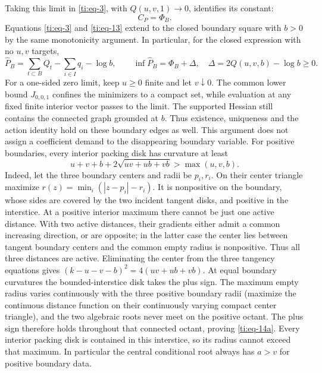 \documentclass[11pt]{article}
\numberwithin{equation}{section}
\theoremstyle{definition}\newtheorem{definition}[theorem]{Definition}
\theoremstyle{remark}\newtheorem{remark}[theorem]{Remark}
\begin{document}
Taking this limit in \eqref{ti:eq-3}, with \(Q(u,v,1)\to0\), identifies its constant:
\begin{equation}\label{ti:eq-13}
C_P=\Phi_B.
\end{equation}
Equations \eqref{ti:eq-3} and \eqref{ti:eq-13} extend to the closed boundary square with \(b>0\) by the same monotonicity argument. In particular, for the closed expression with no \(u,v\) targets,
\begin{equation}\label{ti:eq-14}
\widehat P_B=\sum_{t\subset B}Q_t-\sum_{i\in I}q_i-\log b,
\qquad
\inf\widehat P_B=\Phi_B+\Delta,\quad
\Delta=2Q(u,v,b)-\log b\ge0.
\end{equation}
For a one-sided zero limit, keep \(u\ge0\) finite and let \(v\downarrow0\).
The common lower bound \(J_{0,0,1}\) confines the minimizers to a
compact set, while evaluation at any fixed finite interior vector
passes to the limit. The supported Hessian still contains the
connected graph grounded at \(b\). Thus existence, uniqueness and
the action identity hold on these boundary edges as well. This
argument does not assign a coefficient demand to the disappearing
boundary variable.
For positive boundaries, every interior packing disk has curvature at least
\begin{equation}\label{ti:eq-14a}
u+v+b+2\sqrt{uv+ub+vb}>\max(u,v,b).
\end{equation}
Indeed, let the three boundary centers and radii be \(p_i,r_i\). On their center triangle maximize \(r(z)=\min_i(|z-p_i|-r_i)\). It is nonpositive on the boundary, whose sides are covered by the two incident tangent disks, and positive in the interstice. At a positive interior maximum there cannot be just one active distance. With two active distances, their gradients either admit a common increasing direction, or are opposite; in the latter case the center lies between tangent boundary centers and the common empty radius is nonpositive. Thus all three distances are active. Eliminating the center from the three tangency equations gives \((k-u-v-b)^2=4(uv+ub+vb)\). At equal boundary curvatures the bounded-interstice disk takes the plus sign. The maximum empty radius varies continuously with the three positive boundary radii (maximize the continuous distance function on their continuously varying compact center triangle), and the two algebraic roots never meet on the positive octant. The plus sign therefore holds throughout that connected octant, proving \eqref{ti:eq-14a}. Every interior packing disk is contained in this interstice, so its radius cannot exceed that maximum. In particular the central conditional root always has \(a>v\) for positive boundary data.
\end{document}
